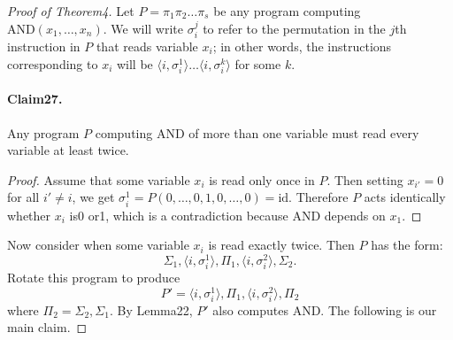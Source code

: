 \documentclass[10pt,a4paper]{article}
\begin{document}
\begin{proof}[Proof of Theorem4]
Let $P=\pi_1\pi_2\ldots\pi_s$ be any program computing $\mathrm{AND}(x_1,\ldots,x_n)$. We will write $\sigma_i^j$ to refer to the permutation in the $j$th instruction in $P$ that reads variable $x_i$; in other words, the instructions corresponding to $x_i$ will be $\langle i,\sigma_i^1\rangle\ldots\langle i,\sigma_i^k\rangle$ for some $k$.
\paragraph{Claim27.} Any program $P$ computing AND of more than one variable must read every variable at least twice.
\begin{proof}
Assume that some variable $x_i$ is read only once in $P$. Then setting $x_{i'}=0$ for all $i'\neq i$, we get $\sigma_i^1=P(0,\ldots,0,1,0,\ldots,0)=\mathrm{id}$. Therefore $P$ acts identically whether $x_i$ is0 or1, which is a contradiction because AND depends on $x_1$.
\end{proof}
Now consider when some variable $x_i$ is read exactly twice. Then $P$ has the form:
\[\Sigma_1,\langle i,\sigma_i^1\rangle,\Pi_1,\langle i,\sigma_i^2\rangle,\Sigma_2.\]
Rotate this program to produce
\[P'=\langle i,\sigma_i^1\rangle,\Pi_1,\langle i,\sigma_i^2\rangle,\Pi_2\]
where $\Pi_2=\Sigma_2,\Sigma_1$. By Lemma22, $P'$ also computes AND.
The following is our main claim.

\end{proof}
\end{document}
